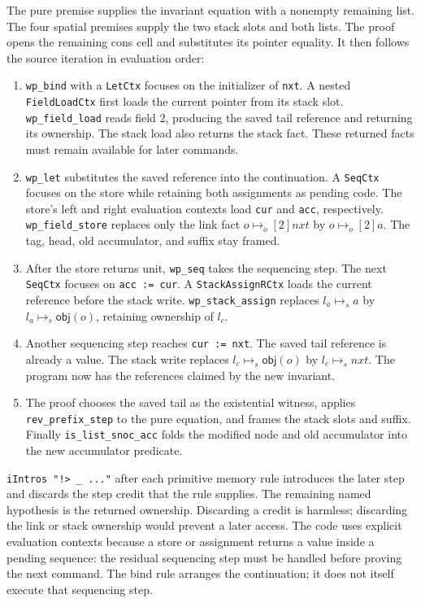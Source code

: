 \documentclass[11pt]{article}
\newcommand{\ptss}{\mathrel{\mapsto_{s}}}
\newcommand{\ptso}{\mathrel{\mapsto_{o}}}
\begin{document}
The pure premise supplies the invariant equation with a nonempty remaining
list. The four spatial premises supply the two stack slots and both lists.
The proof opens the remaining cons cell and substitutes its pointer equality.
It then follows the source iteration in evaluation order:
\begin{enumerate}
\item \texttt{wp\_bind} with a \texttt{LetCtx} focuses on the initializer of
\texttt{nxt}. A nested \texttt{FieldLoadCtx} first loads the current pointer
from its stack slot. \texttt{wp\_field\_load} reads field \(2\), producing the
saved tail reference and returning its ownership. The stack load also returns
the stack fact. These returned facts must remain available for later commands.
\item \texttt{wp\_let} substitutes the saved reference into the continuation.
A \texttt{SeqCtx} focuses on the store while retaining both assignments as
pending code. The store's left and right evaluation contexts load \texttt{cur}
and \texttt{acc}, respectively. \texttt{wp\_field\_store} replaces only the
link fact \(o\ptso[2]\mathit{nxt}\) by \(o\ptso[2]a\).
The tag, head, old accumulator, and suffix stay framed.
\item After the store returns unit, \texttt{wp\_seq} takes the sequencing
step. The next \texttt{SeqCtx} focuses on \texttt{acc := cur}.
A \texttt{StackAssignRCtx} loads the current reference before the stack write.
\texttt{wp\_stack\_assign} replaces \(l_a\ptss a\) by
\(l_a\ptss\mathsf{obj}(o)\), retaining ownership of \(l_c\).
\item Another sequencing step reaches \texttt{cur := nxt}. The saved tail
reference is already a value. The stack write replaces
\(l_c\ptss\mathsf{obj}(o)\) by \(l_c\ptss\mathit{nxt}\).
The program now has the references claimed by the new invariant.
\item The proof chooses the saved tail as the existential witness, applies
\texttt{rev\_prefix\_step} to the pure equation, and frames the stack slots and
suffix. Finally \texttt{is\_list\_snoc\_acc} folds the modified node and old
accumulator into the new accumulator predicate.
\end{enumerate}

\texttt{iIntros "!> \_ ..."} after each primitive memory rule introduces the
later step and discards the step credit that the rule supplies. The remaining
named hypothesis is the returned ownership. Discarding a credit is harmless;
discarding the link or stack ownership would prevent a later access.
The code uses explicit evaluation contexts because a store or assignment
returns a value inside a pending sequence: the residual sequencing step must
be handled before proving the next command. The bind rule arranges the
continuation; it does not itself execute that sequencing step.
\end{document}

